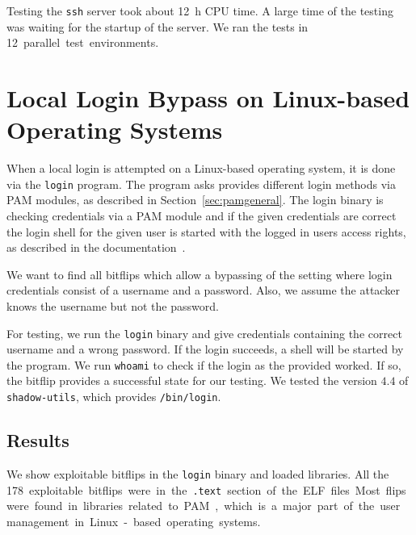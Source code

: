 Testing the \texttt{ssh} server took about \SI{12}{\hour} CPU time. A large time
of the testing was waiting for the startup of the server.  We ran the tests in
\SI{12} parallel test environments.

\section{Local Login Bypass on Linux-based Operating Systems}

When a local login is attempted on a Linux-based operating system, it is done
via the \texttt{login} program. The program asks provides different login
methods via PAM modules, as described in Section~\ref{sec:pamgeneral}. The login
binary is checking credentials via a PAM module and if the given credentials are
correct the login shell for the given user is started with the logged in
user\textquotesingle s access rights, as described in the
documentation~\cite{loginman}.

We want to find all bitflips which allow a bypassing of the setting where login
credentials consist of a username and a password. Also, we assume the attacker
knows the username but not the password.

For testing, we run the \texttt{login} binary and give credentials containing
the correct username and a wrong password. If the login succeeds, a shell will
be started by the program. We run \texttt{whoami} to check if the login as the
provided worked. If so, the bitflip provides a successful state for our
testing. We tested the version $4.4$ of \texttt{shadow-utils}, which provides
\texttt{/bin/login}.

\subsection{Results}

We show exploitable bitflips in the \texttt{login} binary and loaded libraries.
All the \SI{178} exploitable bitflips were in the \texttt{.text} section of the
ELF files. Most flips were found in libraries related to PAM, which is a major
part of the user management in Linux-based operating systems.

